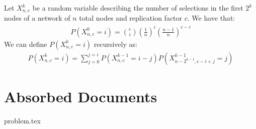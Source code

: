 \documentclass[11pt,twocolumn]{MyTightStyle}
\theoremstyle{plain}
\theoremstyle{definition}
\theoremstyle{remark}
\numberwithin{equation}{section}
\begin{document}
  Let $X_{n,c}^k$ be a random variable describing the number of
  selections in the first $2^k$ nodes of a network of $n$ total nodes
  and replication factor $c$. We have that:
  \begin{eqnarray*}
    P(X_{n,c}^0=i) = {c \choose i}(\frac{1}{n})^i(\frac{n-1}{n})^{c-i} 
  \end{eqnarray*}
  We can define $P(X_{n,c}^k=i)$ recursively as:
  \begin{eqnarray*}
    P(X_{n,c}^k=i) = \sum_{j=0}^{j=i}P(X_{n,c}^{k-1}=
    i-j)P(X_{n-2^{k-1},c-i+j}^{k-1}= j)
  \end{eqnarray*}



\section{Absorbed Documents}

problem.tex
\end{document}
